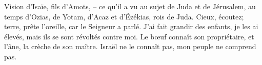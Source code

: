 Vision d’Isaïe, fils d’Amots,
	– ce qu’il a vu au sujet de Juda et de Jérusalem,
	au temps d’Ozias, de Yotam, d’Acaz et d’Ézékias, rois de Juda.
Cieux, écoutez;
	terre, prête l’oreille,
	car le Seigneur a parlé.
J’ai fait grandir des enfants, je les ai élevés,
	mais ils se sont révoltés contre moi.
Le bœuf connaît son propriétaire, et l’âne, la crèche de son maître.
	Israël ne le connaît pas, mon peuple ne comprend pas.
